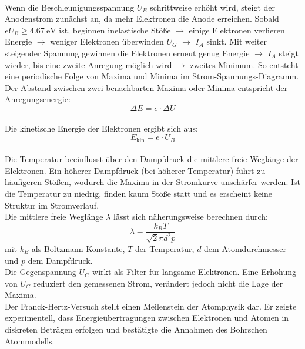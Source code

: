 \vspace{0.3cm}\\
Wenn die Beschleunigungsspannung $U_B$ schrittweise erhöht wird, steigt der Anodenstrom zunächst an, da mehr Elektronen die Anode erreichen. Sobald $e U_B \geq \SI{4.67}{\electronvolt}$ ist, beginnen inelastische Stöße $\rightarrow$ einige Elektronen verlieren Energie $\rightarrow$ weniger Elektronen überwinden $U_G$ $\rightarrow$ $I_A$ sinkt. Mit weiter steigender Spannung gewinnen die Elektronen erneut genug Energie $\rightarrow$ $I_A$ steigt wieder, bis eine zweite Anregung möglich wird $\rightarrow$ zweites Minimum. So entsteht eine periodische Folge von Maxima und Minima im Strom-Spannungs-Diagramm.
\vspace{0.3cm}\\
Der Abstand zwischen zwei benachbarten Maxima oder Minima entspricht der Anregungsenergie:
\begin{equation}
\Delta E = e \cdot \Delta U
\end{equation}
\vspace{0.3cm}\\
Die kinetische Energie der Elektronen ergibt sich aus:
\begin{equation}
E_{\text{kin}} = e \cdot U_B
\end{equation}
\vspace{0.3cm}\\
Die Temperatur beeinflusst über den Dampfdruck die mittlere freie Weglänge der Elektronen. Ein höherer Dampfdruck (bei höherer Temperatur) führt zu häufigeren Stößen, wodurch die Maxima in der Stromkurve unschärfer werden. Ist die Temperatur zu niedrig, finden kaum Stöße statt und es erscheint keine Struktur im Stromverlauf.
\vspace{0.3cm}\\
Die mittlere freie Weglänge $\lambda$ lässt sich näherungsweise berechnen durch:
\begin{equation}
\lambda = \frac{k_B T}{\sqrt{2} \pi d^2 p}
\end{equation}
mit $k_B$ als Boltzmann-Konstante, $T$ der Temperatur, $d$ dem Atomdurchmesser und $p$ dem Dampfdruck.
\vspace{0.3cm}\\
Die Gegenspannung $U_G$ wirkt als Filter für langsame Elektronen. Eine Erhöhung von $U_G$ reduziert den gemessenen Strom, verändert jedoch nicht die Lage der Maxima.
\vspace{0.3cm}\\
Der Franck-Hertz-Versuch stellt einen Meilenstein der Atomphysik dar. Er zeigte experimentell, dass Energieübertragungen zwischen Elektronen und Atomen in diskreten Beträgen erfolgen und bestätigte die Annahmen des Bohrschen Atommodells.
